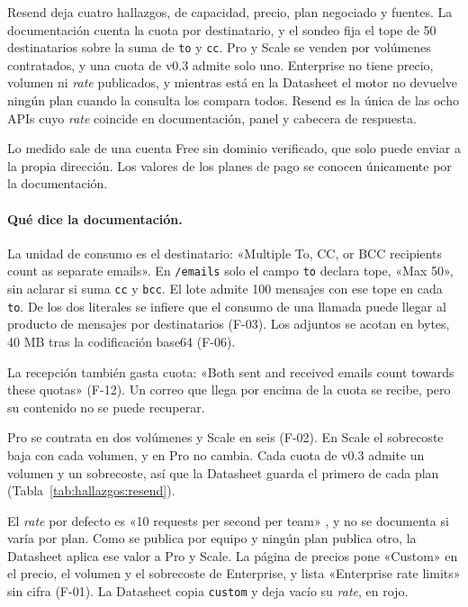 Resend \citep{resendpricing,resenddocs} deja cuatro hallazgos, de capacidad, precio, plan
negociado y fuentes. La documentación cuenta la cuota por destinatario, y
el sondeo fija el tope de 50 destinatarios sobre la suma de \texttt{to} y \texttt{cc}.
Pro y Scale se venden por volúmenes contratados, y una cuota de v0.3 admite solo uno.
Enterprise no tiene precio, volumen ni \textit{rate} publicados, y mientras está en la
Datasheet el motor no devuelve ningún plan cuando la consulta los compara todos. Resend es la única de las ocho APIs cuyo
\textit{rate} coincide en documentación, panel y cabecera de respuesta.

Lo medido sale de una cuenta Free sin dominio verificado, que solo puede enviar a la
propia dirección. Los valores de los planes de pago se conocen únicamente por la documentación.

\paragraph{Qué dice la documentación.} La unidad de consumo es el destinatario:
«Multiple To, CC, or BCC recipients count as separate emails». En \texttt{/emails} solo el
campo \texttt{to} declara tope, «Max 50», sin aclarar si suma \texttt{cc} y
\texttt{bcc}. El lote admite 100 mensajes con ese tope en cada \texttt{to}. De los dos
literales se infiere que el consumo de una llamada puede llegar al producto de mensajes
por destinatarios (F-03). Los adjuntos se acotan en bytes, 40 MB tras la codificación
base64 (F-06).

La recepción también gasta cuota: «Both sent and received emails count towards these
quotas» (F-12). Un correo que llega por encima de la cuota se recibe, pero su contenido no
se puede recuperar.

Pro se contrata en dos volúmenes y Scale en seis (F-02). En Scale el sobrecoste baja con
cada volumen, y en Pro no cambia. Cada cuota de v0.3 admite un volumen y un sobrecoste,
así que la Datasheet guarda el primero de cada plan (Tabla~\ref{tab:hallazgos:resend}).

El \textit{rate} por defecto es «10 requests per second per team»
\citep{resenddocs}, y no se documenta si varía por plan. Como se publica por
equipo y ningún plan publica otro, la Datasheet aplica ese valor a Pro y Scale. La
página de precios pone «Custom» en el precio, el volumen y el sobrecoste de Enterprise,
y lista «Enterprise rate limits» sin cifra (F-01). La Datasheet copia \texttt{custom} y
deja vacío su \textit{rate}, en rojo.

